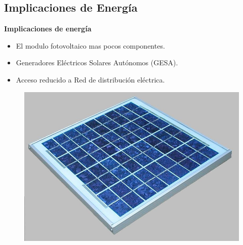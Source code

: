 \documentclass[aspectratio=43, handout]{beamer}
\begin{document}
\subsection[Energía]{Implicaciones de Energía}
\begin{frame}{\textbf{\LARGE{Implicaciones de energía}}} 
\fontsize{15pt}{15}\selectfont
\begin{minipage}[c]{1.0\linewidth}
	\begin{minipage}[c]{0.55\linewidth}
		\begin{itemize}
			\item El modulo fotovoltaico mas pocos componentes.
					\vspace{10px}
			\item Generadores Eléctricos Solares Autónomos (GESA).
					\vspace{10px}
			\item Acceso reducido a Red de distribución eléctrica.
					\vspace{10px}
		\end{itemize}

\end{minipage}
	\begin{minipage}[c]{0.40\linewidth}
		\begin{figure}[H]			
		\includegraphics[width=1.2\textwidth]{./imagenes/ks10t.jpg}
		\end{figure}	  	  	
	\end{minipage}
\end{minipage}
\end{frame}
\end{document}
